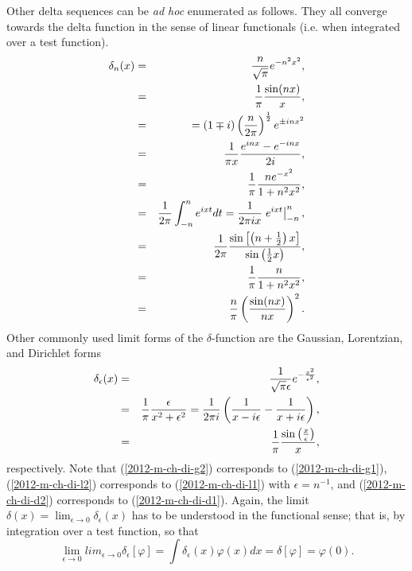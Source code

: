 Other delta sequences can be {\it ad hoc}  enumerated as follows.
They all converge towards the delta function in the sense of linear functionals (i.e. when integrated over a test function).
\begin{eqnarray}
\delta_n(x)
&=& \frac{n}{\sqrt{\pi}} e^{-n^2 x^2},
\label{2012-m-ch-di-g1}\\
&=&
\frac{1}{\pi}   \frac{\sin (n x)}{ x}, \label{2012-m-ch-di-d1}\\
&=&
= (1\mp i)\left( {n\over 2\pi }\right)^{1\over 2} e^{\pm inx^2}  \\
&=&
\frac{1}{\pi x}  \frac{e^{inx}-e^{-inx}}{2i} ,\\
&=&
\frac{1}{\pi}  \frac{n  e^{-x^2}}{1+n^2x^2} ,\\
&=&
\frac{1}{2\pi } \int_{-n}^n e^{ixt} dt  = \frac{1}{2\pi i x} \left. e^{ixt}\right|_{-n}^n    ,\\
&=&
\frac{1}{2\pi} \frac{\sin \left[\left( n+\frac{1}{2}\right) x \right]  }{\sin \left( \frac{1}{2}x \right)   },\\
&=&
\frac{1}{\pi}\frac{n}{1+ n^2x^2},    \label{2012-m-ch-di-l1} \\
&=&
\frac{n}{ \pi}\left(\frac{\sin (nx)}{nx}\right)^2.
\end{eqnarray}
Other commonly used limit forms of the $\delta $-function are the Gaussian, Lorentzian, and Dirichlet forms
\begin{eqnarray}
\delta_\epsilon (x) &=&   \frac{1}{\sqrt{\pi } \epsilon } e^{-\frac{x^2}{\epsilon^2}} ,
\label{2012-m-ch-di-g2} \\
&=&  \frac{1}{\pi} \frac{\epsilon }{x^2+\epsilon^2}
=   {1\over 2\pi i}
\left(
{1 \over x-i\epsilon }
-
{1 \over x+i\epsilon }
 \right)
 , \label{2012-m-ch-di-l2}  \\
&=&  \frac{1}{\pi } \frac{\sin \left(\frac{x}{\epsilon }\right)}{x} ,  \label{2012-m-ch-di-d2}
\end{eqnarray}
respectively.
Note that
(\ref{2012-m-ch-di-g2}) corresponds to (\ref{2012-m-ch-di-g1}),
(\ref{2012-m-ch-di-l2}) corresponds to (\ref{2012-m-ch-di-l1}) with $\epsilon=n^{-1}$,
and
(\ref{2012-m-ch-di-d2}) corresponds to (\ref{2012-m-ch-di-d1}).
Again, the limit
$
\delta (x)= \lim_{\epsilon \rightarrow 0} \delta_\epsilon (x)
$
has to be understood in the functional sense; that is, by integration over a test function,
so that
\begin{equation}
\lim_{\epsilon \rightarrow 0} lim_{\epsilon \rightarrow 0}\delta_\epsilon [\varphi]=
\int \delta_\epsilon (x) \varphi (x) dx  =    \delta [\varphi]=\varphi (0).
\end{equation}





